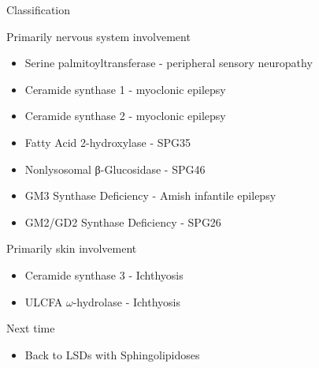 \documentclass[presentation, smaller]{beamer}
\begin{document}
\begin{frame}[label={sec:orgheadline14}]{Classification}
\begin{block}{Primarily nervous system involvement}
\begin{itemize}
\item Serine palmitoyltransferase - peripheral sensory neuropathy
\item Ceramide synthase 1 - myoclonic epilepsy
\item Ceramide synthase 2 - myoclonic epilepsy
\item Fatty Acid 2-hydroxylase - SPG35
\item Nonlysosomal β-Glucosidase - SPG46
\item GM3 Synthase Deficiency - Amish infantile epilepsy
\item GM2/GD2 Synthase Deficiency - SPG26
\end{itemize}
\end{block}


\begin{block}{Primarily skin involvement}
\begin{itemize}
\item Ceramide synthase 3 - Ichthyosis
\item ULCFA \(\omega\)-hydrolase - Ichthyosis
\end{itemize}
\end{block}
\end{frame}

\begin{frame}[label={sec:orgheadline15}]{Next time}
\begin{itemize}
\item Back to LSDs with Sphingolipidoses
\end{itemize}
\end{frame}
\end{document}
